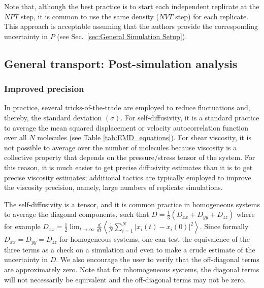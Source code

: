 \documentclass[9pt,bestpractices]{livecoms}
\begin{document}
Note that, although the best practice is to start each independent replicate at the $NPT$ step, it is common to use the same density ($NVT$ step) for each replicate. This approach is acceptable assuming that the authors provide the corresponding uncertainty in $P$ (see Sec.\ \ref{sec:General Simulation Setup}).



\subsection{General transport: Post-simulation analysis} \label{sec:General: Post-simulation}

\subsubsection{Improved precision} \label{sec:General: Improve precision}

In practice, several tricks-of-the-trade are employed to reduce fluctuations and, thereby, the standard deviation $(\sigma)$. For self-diffusivity, it is a standard practice to average the mean squared displacement or velocity autocorrelation function over all $N$ molecules (see Table \ref{tab:EMD_equations}). For shear viscosity, it is not possible to average over the number of molecules because viscosity is a collective property that depends on the pressure/stress tensor of the system. For this reason, it is much easier to get precise diffusivity estimates than it is to get precise viscosity estimates; additional tactics are typically employed to improve the viscosity precision, namely, large numbers of replicate simulations.

The self-diffusivity is a tensor, and it is common practice in homogeneous systems to average the diagonal components, such that $D = \frac{1}{3} (D_{xx} + D_{yy} + D_{zz})$ where for example $ D_{xx}=\displaystyle \frac{1}{2} \lim_{t\to\infty} \frac{d}{dt} \left\langle \frac{1}{N} \sum_{i=1}^{N} |x_i(t)-x_i(0)|^2 \right\rangle$. Since formally $D_{xx}=D_{yy}=D_{zz}$ for homogeneous systems, one can test the equivalence of the three terms as a check on a simulation and even to make a crude estimate of the uncertainty in $D$. We also encourage the user to verify that the off-diagonal terms are approximately zero. Note that for inhomogeneous systems, the diagonal terms will not necessarily be equivalent and the off-diagonal terms may not be zero. 
\end{document}
